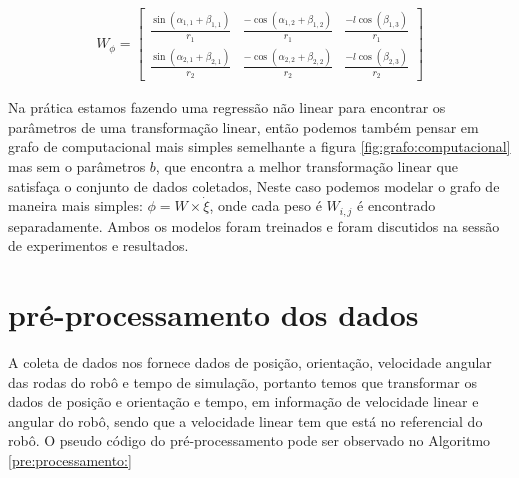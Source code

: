 \begin{align}
    W_{\phi} = 
    \begin{bmatrix}
        \frac{\sin(\alpha_{1,1} + \beta_{1,1})}{r_1} &  \frac{-\cos(\alpha_{1,2} + \beta_{1,2})}{r_1} & \frac{-l\cos(\beta_{1,3})}{r_1} \\
        \frac{\sin(\alpha_{2,1} + \beta_{2,1})}{r_2} &  \frac{-\cos(\alpha_{2,2} + \beta_{2,2})}{r_2} & \frac{-l\cos(\beta_{2,3})}{r_2}
    \end{bmatrix}
\end{align}

Na prática estamos fazendo uma regressão não linear para encontrar
os parâmetros de uma transformação linear, então podemos também pensar em
grafo de computacional mais simples semelhante a
figura \ref{fig:grafo:computacional} mas sem o parâmetros $b$, 
que encontra a melhor transformação
linear que satisfaça o conjunto de dados coletados,
Neste caso podemos modelar o grafo de maneira mais simples: $\phi=W \times \dot{\xi}$,
onde cada peso é $W_{i,j}$ é encontrado separadamente. Ambos os modelos foram
treinados e foram discutidos na sessão de experimentos e resultados.


\section{pré-processamento dos dados}
A coleta de dados nos fornece dados de posição, orientação, velocidade angular
das rodas do robô e tempo de simulação, portanto temos que transformar os dados
de posição e orientação e tempo, em informação de velocidade linear e angular
do robô, sendo que a velocidade linear tem que está no referencial do robô.
O pseudo código do pré-processamento pode ser observado no Algoritmo \ref{pre:processamento:}

